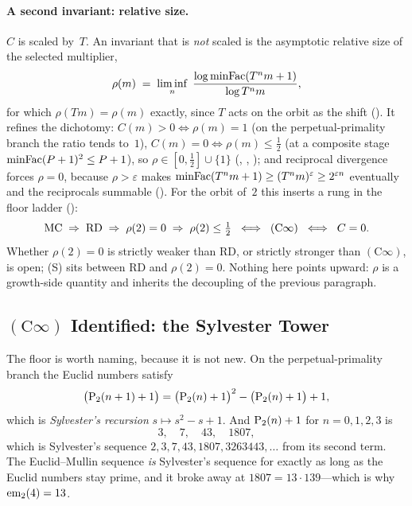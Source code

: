 \paragraph{A second invariant: relative size.}
\label{sec:relative-size}
$C$ is scaled by~$T$.  An invariant that is \emph{not} scaled is the
asymptotic relative size of the selected multiplier,
\[
  \rho(m) \;=\; \liminf_{n}\;
  \frac{\log \mathrm{minFac}(T^n m + 1)}{\log T^n m},
\]
for which $\rho(Tm) = \rho(m)$ exactly, since $T$ acts on the orbit as the
shift ().  It refines the
dichotomy: $C(m) > 0 \iff \rho(m) = 1$ (on the perpetual-primality branch
the ratio tends to~$1$), $C(m) = 0 \iff \rho(m) \le \tfrac12$ (at a
composite stage $\mathrm{minFac}(P+1)^2 \le P+1$), so $\rho \in [0,\tfrac12] \cup
\{1\}$
(,
 ,
 ); and reciprocal
divergence forces $\rho = 0$, because $\rho > \varepsilon$ makes
$\mathrm{minFac}(T^n m+1) \ge (T^n m)^{\varepsilon} \ge 2^{\varepsilon n}$
eventually and the reciprocals summable
().  For
the orbit of~$2$ this inserts a rung in the floor ladder
():
\[
  \mathrm{MC} \;\Rightarrow\; \mathrm{RD} \;\Rightarrow\; \rho(2) = 0
  \;\Rightarrow\; \rho(2) \le \tfrac12 \;\iff\; (\mathrm{C}\infty)
  \;\iff\; C = 0 .
\]
Whether $\rho(2) = 0$ is strictly weaker than RD, or strictly stronger
than $(\mathrm{C}\infty)$, is open; (S) sits between RD and $\rho(2)=0$.
Nothing here points upward: $\rho$ is a growth-side quantity and inherits
the decoupling of the previous paragraph.

\subsection{$(\mathrm{C}\infty)$ Identified: the Sylvester Tower}
\label{sec:sylvester-tower}

The floor is worth naming, because it is not new.  On the
perpetual-primality branch the Euclid numbers satisfy
\[
  \bigl(\mathrm{P}_{2}(n+1)+1\bigr)
  = \bigl(\mathrm{P}_{2}(n)+1\bigr)^{2} - \bigl(\mathrm{P}_{2}(n)+1\bigr) + 1,
\]
which is \emph{Sylvester's recursion} $s \mapsto s^2 - s + 1$.  And
$\mathrm{P}_{2}(n)+1$ for $n = 0,1,2,3$ is
\[
  3,\quad 7,\quad 43,\quad 1807,
\]
which is Sylvester's sequence $2, 3, 7, 43, 1807, 3263443, \dots$ from
its second term.  The Euclid--Mullin sequence \emph{is} Sylvester's
sequence for exactly as long as the Euclid numbers stay prime, and it
broke away at $1807 = 13 \cdot 139$---which is why $\mathrm{em}_{2}(4) = 13$.

